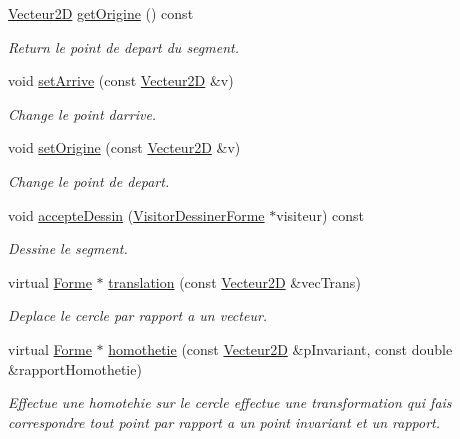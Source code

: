 \begin{DoxyCompactItemize}
\mbox{\label{class_segment_ae8017861cf4d3d685f9ee5a5eadfeaa0}} 
\mbox{\hyperlink{class_vecteur2_d}{Vecteur2D}} \mbox{\hyperlink{class_segment_ae8017861cf4d3d685f9ee5a5eadfeaa0}{get\+Origine}} () const
\begin{DoxyCompactList}\small\item\em Return le point de depart du segment. \end{DoxyCompactList}\item 
void \mbox{\hyperlink{class_segment_a3b33717b3f597a5a723b9f92d989ace2}{set\+Arrive}} (const \mbox{\hyperlink{class_vecteur2_d}{Vecteur2D}} \&v)
\begin{DoxyCompactList}\small\item\em Change le point d\textquotesingle{}arrive. \end{DoxyCompactList}\item 
void \mbox{\hyperlink{class_segment_ae22cb982d85cec7a92c7dd1c2c862210}{set\+Origine}} (const \mbox{\hyperlink{class_vecteur2_d}{Vecteur2D}} \&v)
\begin{DoxyCompactList}\small\item\em Change le point de depart. \end{DoxyCompactList}\item 
void \mbox{\hyperlink{class_segment_ab9106868b99c5238e1b46c0e86280913}{accepte\+Dessin}} (\mbox{\hyperlink{class_visitor_dessiner_forme}{Visitor\+Dessiner\+Forme}} $\ast$visiteur) const
\begin{DoxyCompactList}\small\item\em Dessine le segment. \end{DoxyCompactList}\item 
virtual \mbox{\hyperlink{class_forme}{Forme}} $\ast$ \mbox{\hyperlink{class_segment_a0a4ba467ac01d3ece7c5136faf08be1a}{translation}} (const \mbox{\hyperlink{class_vecteur2_d}{Vecteur2D}} \&vec\+Trans)
\begin{DoxyCompactList}\small\item\em Deplace le cercle par rapport a un vecteur. \end{DoxyCompactList}\item 
virtual \mbox{\hyperlink{class_forme}{Forme}} $\ast$ \mbox{\hyperlink{class_segment_ac1bcee908f7c0a051fc72efa9e3e4b57}{homothetie}} (const \mbox{\hyperlink{class_vecteur2_d}{Vecteur2D}} \&p\+Invariant, const double \&rapport\+Homothetie)
\begin{DoxyCompactList}\small\item\em Effectue une homotehie sur le cercle effectue une transformation qui fais correspondre tout point par rapport a un point invariant et un rapport. \end{DoxyCompactList}\item 

\end{DoxyCompactItemize}
